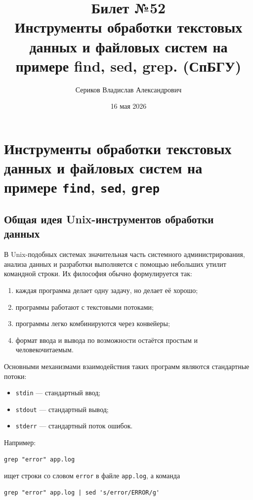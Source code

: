 \documentclass[12pt,a4paper]{article}
\title{Билет №52 \\ \small Инструменты обработки текстовых данных и файловых систем на примере find, sed, grep. (СпБГУ)}
\author{Сериков Владислав Александрович}
\date{16 мая 2026}
\begin{document}
\maketitle
\tableofcontents
\newpage

\section{Инструменты обработки текстовых данных и файловых систем на примере \texttt{find}, \texttt{sed}, \texttt{grep}}

\subsection{Общая идея Unix-инструментов обработки данных}

В Unix-подобных системах значительная часть системного администрирования, анализа данных и разработки выполняется с помощью небольших утилит командной строки. Их философия обычно формулируется так:

\begin{enumerate}
    \item каждая программа делает одну задачу, но делает её хорошо;
    \item программы работают с текстовыми потоками;
    \item программы легко комбинируются через конвейеры;
    \item формат ввода и вывода по возможности остаётся простым и человекочитаемым.
\end{enumerate}

Основными механизмами взаимодействия таких программ являются стандартные потоки:

\begin{itemize}
    \item \texttt{stdin} --- стандартный ввод;
    \item \texttt{stdout} --- стандартный вывод;
    \item \texttt{stderr} --- стандартный поток ошибок.
\end{itemize}

Например:

\begin{verbatim}
grep "error" app.log
\end{verbatim}

ищет строки со словом \texttt{error} в файле \texttt{app.log}, а команда

\begin{verbatim}
grep "error" app.log | sed 's/error/ERROR/g'
\end{verbatim}
\end{document}
